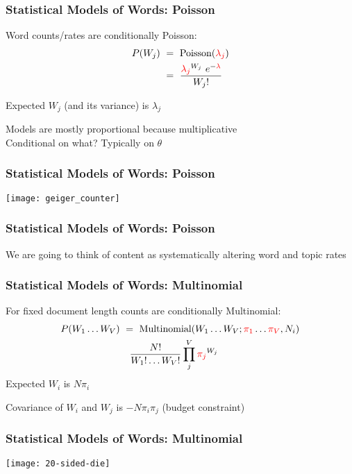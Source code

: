 \documentclass[11pt,compress,professionalfonts]{beamer}
\begin{document}
\begin{frame}[t,fragile]\frametitle{Statistical Models of Words: Poisson}

Word counts/rates are conditionally Poisson:
\begin{align*}
P(W_j) &~=~ \text{Poisson}(\textcolor{red}{\lambda_{j}})\\
&~=~ \frac{\textcolor{red}{\lambda_{j}}^{W_{j}}~e^{-\textcolor{red}{\lambda}}}{W_{j}!}
\end{align*}

Expected $W_{j}$ (and its variance) is $\lambda_{j}$

Models are mostly proportional because multiplicative
~\\
Conditional on what?  Typically on $\theta$

\end{frame}
\begin{frame}[t,fragile]\frametitle{Statistical Models of Words: Poisson}

\centerline{\texttt{[image: geiger\_counter]}}

\end{frame}
\begin{frame}[t,fragile]\frametitle{Statistical Models of Words: Poisson}

We are going to think of content as systematically altering word and topic rates

\end{frame}
\begin{frame}[t,fragile]\frametitle{Statistical Models of Words: Multinomial}

For fixed document length counts are conditionally Multinomial:
\begin{align*}
P(W_{1}\ldots W_{V}) &~=~ \text{Multinomial}(W_{1}\ldots W_{V}; \textcolor{red}{\pi_{1}}\ldots\textcolor{red}{\pi_{V}}, N_i)\\
&~~~\frac{N!}{W_{1}!\ldots W_{V}!} \prod^{V}_{j} \textcolor{red}{\pi_{j}}^{W_{j}}
\end{align*}
Expected $W_{i}$ is $N\pi_{i}$

Covariance of $W_{i}$ and $W_{j}$ is $-N \pi_{i}\pi_{j}$ (budget constraint)

\end{frame}
\begin{frame}[t,fragile]\frametitle{Statistical Models of Words: Multinomial}

\centerline{\texttt{[image: 20-sided-die]}}

\end{frame}
\end{document}
